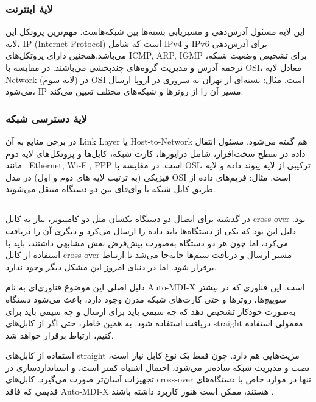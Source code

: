 \documentclass[12pt]{article}
\begin{document}
	\subsubsection*{لایهٔ اینترنت}
	این لایه مسئول آدرس‌دهی و مسیریابی بسته‌ها بین شبکه‌هاست. مهم‌ترین پروتکل این لایه، \textenglish{IP (Internet Protocol)} است که شامل IPv4 و IPv6 برای آدرس‌دهی می‌باشد.همچنین دارای پروتکل‌های \textenglish{ICMP, ARP, IGMP} برای تشخیص وضعیت شبکه، ترجمه آدرس و مدیریت گروه‌های چندپخشی می‌باشند. در مقایسه با \textenglish{OSI}، معادل لایه Network (لایه سوم) در 
	\textenglish{OSI}
	 است. مثال: بسته‌ای از تهران به سروری در اروپا ارسال می‌شود، IP مسیر آن را از روترها و شبکه‌های مختلف تعیین می‌کند.
	\subsubsection*{لایهٔ دسترسی شبکه}
	در برخی منابع به آن \textenglish{Link Layer} یا Host-to-Network هم گفته می‌شود. مسئول انتقال داده در سطح سخت‌افزار، شامل درایورها، کارت شبکه، کابل‌ها و پروتکل‌های لایه دوم مانند \
	\textenglish{Ethernet, Wi-Fi, PPP}
	 است. در مقایسه با \textenglish{OSI}، ترکیبی از لایه پیوند داده و لایه فیزیکی (به ترتیب لایه های دوم و اول) در مدل OSI است. مثال: فریم‌های داده از طریق کابل شبکه یا وای‌فای بین دو دستگاه منتقل می‌شوند.
	\subsection{}
	در گذشته برای اتصال دو دستگاه یکسان مثل دو کامپیوتر، نیاز به کابل cross-over بود. دلیل این بود که یکی از دستگاه‌ها باید داده را ارسال می‌کرد و دیگری آن را دریافت می‌کرد، اما چون هر دو دستگاه به‌صورت پیش‌فرض نقش مشابهی داشتند، باید با استفاده از کابل cross-over مسیر ارسال و دریافت سیم‌ها جابه‌جا می‌شد تا ارتباط برقرار شود. اما در دنیای امروز این مشکل دیگر وجود ندارد.
	
	دلیل اصلی این موضوع فناوری‌ای به نام Auto-MDI-X است. این فناوری که در بیشتر سوییچ‌ها، روترها و حتی کارت‌های شبکه مدرن وجود دارد، باعث می‌شود دستگاه به‌صورت خودکار تشخیص دهد که چه سیمی باید برای ارسال و چه سیمی باید برای دریافت استفاده شود. به همین خاطر، حتی اگر از کابل‌های straight معمولی استفاده کنیم، ارتباط برقرار خواهد شد.
	
	استفاده از کابل‌های straight مزیت‌هایی هم دارد. چون فقط یک نوع کابل نیاز است، نصب و مدیریت شبکه ساده‌تر می‌شود، احتمال اشتباه کمتر است، و استانداردسازی در تجهیزات آسان‌تر صورت می‌گیرد. کابل‌های cross-over تنها در موارد خاص با دستگاه‌های قدیمی که فاقد Auto-MDI-X هستند، ممکن است هنوز کاربرد داشته باشند 
	\cite{a11, a12, a13}.
	
	\newpage
	\begin{LTR}
		\printbibliography[title={مراجع}]
	\end{LTR}

	
\end{document}
